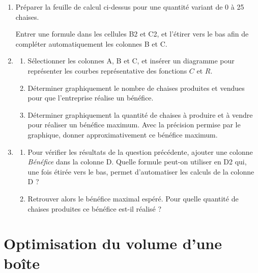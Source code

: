 \documentclass[
	classe=$1^{ere}STI2D$,
	headerTitle=Informatique
]{exercice}
\begin{document}
\begin{enumerate}
	\item Préparer la feuille de calcul ci-dessus pour une quantité variant de 0 à 25 chaises.

	      Entrer une formule dans les cellules B2 et C2, et l'étirer vers le bas afin de compléter automatiquement les colonnes B et C.
	\item \begin{enumerate}
		      \item Sélectionner les colonnes A, B et C, et insérer un diagramme pour représenter les courbes représentative des fonctions $C$ et $R$.

		            \begin{center}
		            \end{center}
		      \item Déterminer graphiquement le nombre de chaises produites et vendues pour que l'entreprise réalise un bénéfice.
		      \item Déterminer graphiquement la quantité de chaises à produire et à vendre pour réaliser un bénéfice maximum. Avec la précision permise par le graphique, donner approximativement ce bénéfice maximum.
	      \end{enumerate}
	\item \begin{enumerate}
		      \item Pour vérifier les résultats de la question précédente, ajouter une colonne \textit{Bénéfice} dans la colonne D. Quelle formule peut-on utiliser en D2 qui, une fois étirée vers le bas, permet d'automatiser les calculs de la colonne D ?
		      \item Retrouver alors le bénéfice maximal espéré. Pour quelle quantité de chaises produites ce bénéfice est-il réalisé ?
	      \end{enumerate}
\end{enumerate}

\section{Optimisation du volume d'une boîte}
\end{document}
